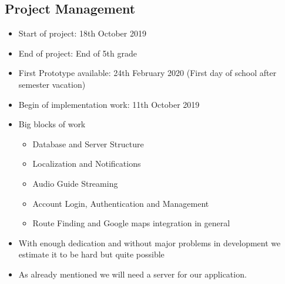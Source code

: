 \documentclass[12pt]{article}
\theoremstyle{definition}
\begin{document}
\subsection{Project Management}
\begin{itemize}
    \item Start of project: 18th October 2019
    \item End of project: End of 5th grade
    \newline
    \item First Prototype available: 24th February 2020 (First day of school after semester vacation)
    \item Begin of implementation work: 11th October 2019
    \newline
    \newline
    \item Big blocks of work
    \begin{itemize}
        \item Database and Server Structure
        \item Localization and Notifications
        \item Audio Guide Streaming
        \item Account Login, Authentication and Management
        \item Route Finding and Google maps integration in general
    \end{itemize}
    \item With enough dedication and without major problems in development we estimate it to be hard but quite possible
    \item As already mentioned we will need a server for our application.
    
\end{itemize} 
\end{document}
